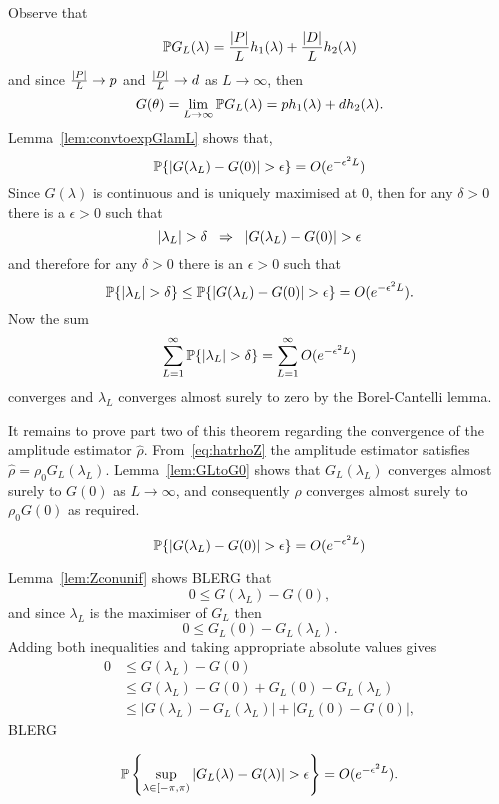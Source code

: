 \documentclass[journal]{IEEEtran}
\begin{document}
\begin{IEEEproof}
Observe that
\[
{\mathbb P} G_L(\lambda) = \frac{{\left| P \right|}}{L} h_1(\lambda) + \frac{{\left| D \right|}}{L} h_2(\lambda)
\]
and since $\frac{{\left| P \right|}}{L} \rightarrow p$ and $\frac{{\left| D \right|}}{L} \rightarrow d$ as $L \rightarrow \infty$, then
\[
G(\theta) = \lim_{L \rightarrow\infty} {\mathbb P} G_L(\lambda) = p h_1(\lambda)   +  d h_2(\lambda).
\]
Lemma~\ref{lem:convtoexpGlamL} shows that,
\[
{\mathbb P}\{ {\left| G(\lambda_L) - G(0) \right|} > \epsilon \} = O(e^{-\epsilon^2 L})
\]
Since $G(\lambda)$ is continuous and is uniquely maximised at $0$, then for any $\delta > 0$ there is a $\epsilon > 0$ such that 
\[
{\left| \lambda_L \right|} > \delta \;\; \Rightarrow \;\; {\left| G(\lambda_L) - G(0) \right|} > \epsilon
\]
and therefore for any $\delta > 0$ there is an $\epsilon > 0$ such that
\[
{\mathbb P}\{{\left| \lambda_L \right|} > \delta\} \leq {\mathbb P}\{ {\left| G(\lambda_L) - G(0) \right|} > \epsilon \} = O(e^{-\epsilon^2 L}).
\]
Now the sum 
\[
\sum_{L=1}^{\infty}{\mathbb P}\{ {\left| \lambda_L \right|} > \delta \} = \sum_{L=1}^{\infty}O(e^{-\epsilon^2 L})
\]
converges and $\lambda_L$ converges almost surely to zero by the Borel-Cantelli lemma.

It remains to prove part two of this theorem regarding the convergence of the amplitude estimator $\hat{\rho}$.  From~\eqref{eq:hatrhoZ} the amplitude estimator satisfies $\hat{\rho} = \rho_0 G_L(\lambda_L)$.  Lemma~\ref{lem:GLtoG0} shows that $G_L(\lambda_L)$ converges almost surely to $G(0)$ as $L\rightarrow\infty$, and consequently $\hat{\rho}$ converges almost surely to $\rho_0 G(0)$ as required.
\end{IEEEproof}

\begin{lemma}\label{lem:convtoexpGlamL}
\[
{\mathbb P}\{ {\left| G(\lambda_L) - G(0) \right|} > \epsilon \} = O(e^{-\epsilon^2 L})
\]
\end{lemma}
\begin{IEEEproof}
Lemma~\ref{lem:Zconunif} shows BLERG that 
\[
0 \leq G(\lambda_L) - G(0),
\]
and since $\lambda_L$ is the maximiser of $G_L$ then
\[ 
0 \leq G_L(0) - G_L(\lambda_L).
\]
Adding both inequalities and taking appropriate absolute values gives
\begin{align*}
0 &\leq G(\lambda_L) - G(0) \\ 
& \leq G(\lambda_L) - G(0) + G_L(0) - G_L(\lambda_L) \\
& \leq |G(\lambda_L) - G_L(\lambda_L)| + |G_L(0) - G(0)|,
\end{align*}
BLERG
\end{IEEEproof}

\begin{lemma}\label{lem:Zconunif}
\[
{\mathbb P}\left\{\sup_{\lambda \in [-\pi, \pi)}{\left| G_L(\lambda) - G(\lambda) \right|} > \epsilon \right\} = O(e^{-\epsilon^2 L}).
\]
\end{lemma}
\begin{IEEEproof}
\end{IEEEproof}
\end{document}
